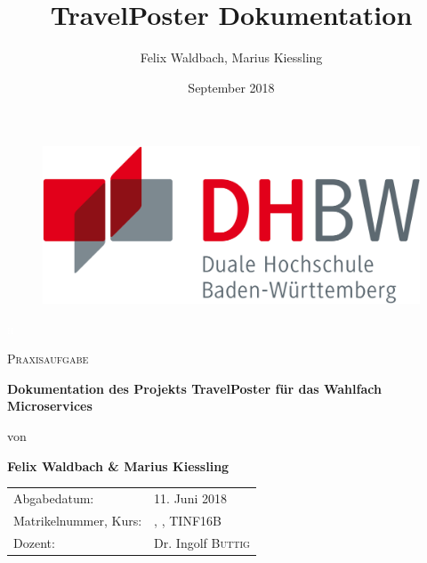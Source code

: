 \documentclass[12pt,a4paper]{report}
\author{Felix Waldbach, Marius Kiessling}
\title{TravelPoster Dokumentation}
\date{September 2018}
\begin{document}


\begin{titlepage}
	\centering

\begin{figure}
\begin{minipage}[hbt]{5cm}
	\centering
	\includegraphics[scale=0.1]{Bilder_Doku/DHBW-Logo.png}	
\end{minipage}
\end{figure}
\newlength{\drop}
	\textheight 
	\centering	

	\textcolor{white}{\scshape\Large h}\par		
	\vspace{1cm}
	{\scshape\Large Praxisaufgabe\par}	
	\vspace{1cm}
	{\huge\bfseries Dokumentation des Projekts TravelPoster für das Wahlfach Microservices \par}
	\vspace{1cm}
	{\Large von\par}
	{\Large\bfseries Felix Waldbach \& Marius Kiessling\par}
	\vfill
	\vspace{3cm}
	{\scshape\Large \par}

	\begin{tabular}{ll}
		Abgabedatum: & 11. Juni 2018 \\		
		Matrikelnummer, Kurs: & \matrikelnrFelix, \matrikelnrMarius, TINF16B \\ 
		Dozent: & 
		Dr. Ingolf \textsc{Buttig}\\ 
 
	\end{tabular}	
	
	\vfill

	
\end{titlepage}
\end{document}
